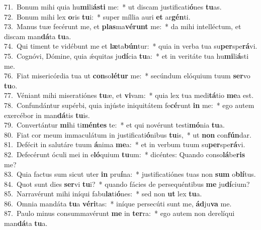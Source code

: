 {71.~}Bonum mihi quia hu\textbf{mi}li\textbf{á}\textbf{sti} me:~* ut discam justificati\textbf{ó}nes \textbf{tu}as.\\
{72.~}Bonum mihi lex \textbf{o}ris \textbf{tu}i:~* super míllia auri \textbf{et} ar\textbf{gén}ti.\\
{73.~}Manus tuæ fecérunt me, et \textbf{plas}ma\textbf{vé}\textbf{runt} me:~* da mihi intelléctum, et discam man\textbf{dá}ta \textbf{tu}a.\\
{74.~}Qui timent te vidébunt me et \textbf{læ}ta\textbf{bún}tur:~* quia in verba tua su\textbf{per}spe\textbf{rá}vi.\\
{75.~}Cognóvi, Dómine, quia ǽquitas ju\textbf{dí}cia \textbf{tu}a:~* et in veritáte tua hu\textbf{mi}li\textbf{á}sti me.\\
{76.~}Fiat misericórdia tua ut \textbf{con}so\textbf{lé}\textbf{tur} me:~* secúndum elóquium tuum \textbf{ser}vo \textbf{tu}o.\\
{77.~}Véniant mihi miseratiónes \textbf{tu}æ, et \textbf{vi}vam:~* quia lex tua medi\textbf{tá}tio \textbf{me}a est.\\
{78.~}Confundántur supérbi, quia injúste iniquitátem fe\textbf{cé}runt \textbf{in} me:~* ego autem exercébor in man\textbf{dá}tis \textbf{tu}is.\\
{79.~}Convertántur \textbf{mi}hi ti\textbf{mén}\textbf{tes} te:~* et qui novérunt testi\textbf{mó}nia \textbf{tu}a.\\
{80.~}Fiat cor meum immaculátum in justificati\textbf{ó}nibus \textbf{tu}is,~* ut \textbf{non} con\textbf{fún}dar.\\
{81.~}Defécit in salutáre tuum \textbf{á}nima \textbf{me}a:~* et in verbum tuum su\textbf{per}spe\textbf{rá}vi.\\
{82.~}Defecérunt óculi mei in e\textbf{ló}quium \textbf{tu}um:~* dicéntes: Quando conso\textbf{lá}be\textbf{ris} me?\\
{83.~}Quia factus sum sicut uter \textbf{in} pru\textbf{í}na:~* justificatiónes tuas non \textbf{sum} o\textbf{blí}tus.\\
{84.~}Quot sunt dies \textbf{ser}vi \textbf{tu}i?~* quando fácies de persequéntibus \textbf{me} ju\textbf{dí}cium?\\
{85.~}Narravérunt mihi iníqui fabu\textbf{la}ti\textbf{ó}nes:~* sed non \textbf{ut} lex \textbf{tu}a.\\
{86.~}Omnia mandáta \textbf{tu}a \textbf{vé}\textbf{ri}tas:~* iníque persecúti sunt me, \textbf{ád}ju\textbf{va} me.\\
{87.~}Paulo minus consummavérunt \textbf{me} in \textbf{ter}ra:~* ego autem non derelíqui man\textbf{dá}ta \textbf{tu}a.\\
